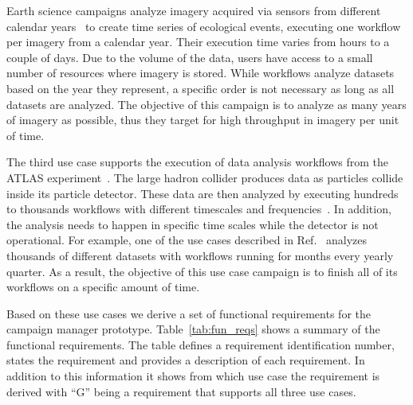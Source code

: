Earth science campaigns analyze imagery acquired via sensors from different calendar years~\cite{paraskevakos2019workflow} to create time series of ecological events, executing one workflow per imagery from a calendar year.
Their execution time varies from hours to a couple of days.
Due to the volume of the data, users have access to a small number of resources where imagery is stored.
While workflows analyze datasets based on the year they represent, a specific order is not necessary as long as all datasets are analyzed.
The objective of this campaign is to analyze as many years of imagery as possible, thus they target for high throughput in imagery per unit of time.

The third use case supports the execution of data analysis workflows from the ATLAS experiment~\cite{atlas}.
The large hadron collider produces data as particles collide inside its particle detector.
These data are then analyzed by executing hundreds to thousands workflows with different timescales and frequencies~\cite{borodin2015big}.
In addition, the analysis needs to happen in specific time scales while the detector is not operational.
For example, one of the use cases described in Ref.~\cite{borodin2015big} analyzes thousands of different datasets with workflows running for months every yearly quarter.
As a result, the objective of this use case campaign is to finish all of its workflows on a specific amount of time.


Based on these use cases we derive a set of functional requirements for the campaign manager prototype. 
Table~\ref{tab:fun_reqs} shows a summary of the functional requirements.
The table defines a requirement identification number, states the requirement and provides a description of each requirement.
In addition to this information it shows from which use case the requirement is derived with ``G'' being a requirement that supports all three use cases. 

